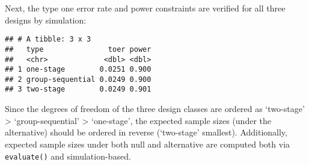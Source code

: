 \documentclass[
]{book}
\newenvironment{Shaded}{\begin{snugshade}}{\end{snugshade}}
\newcommand{\AttributeTok}[1]{\textcolor[rgb]{0.77,0.63,0.00}{#1}}
\newcommand{\DecValTok}[1]{\textcolor[rgb]{0.00,0.00,0.81}{#1}}
\newcommand{\FunctionTok}[1]{\textcolor[rgb]{0.00,0.00,0.00}{#1}}
\newcommand{\NormalTok}[1]{#1}
\newcommand{\SpecialCharTok}[1]{\textcolor[rgb]{0.00,0.00,0.00}{#1}}
\begin{document}
Next, the type one error rate and power constraints are verified
for all three designs by simulation:

\begin{Shaded}
\end{Shaded}

\begin{verbatim}
## # A tibble: 3 x 3
##   type               toer power
##   <chr>             <dbl> <dbl>
## 1 one-stage        0.0251 0.900
## 2 group-sequential 0.0249 0.900
## 3 two-stage        0.0249 0.901
\end{verbatim}

Since the degrees of freedom of the three design classes are ordered as
`two-stage' \textgreater{} `group-sequential' \textgreater{} `one-stage',
the expected sample sizes (under the alternative) should be ordered
in reverse (`two-stage' smallest).
Additionally, expected sample sizes under both null and alternative
are computed both via \texttt{evaluate()} and simulation-based.
\end{document}
